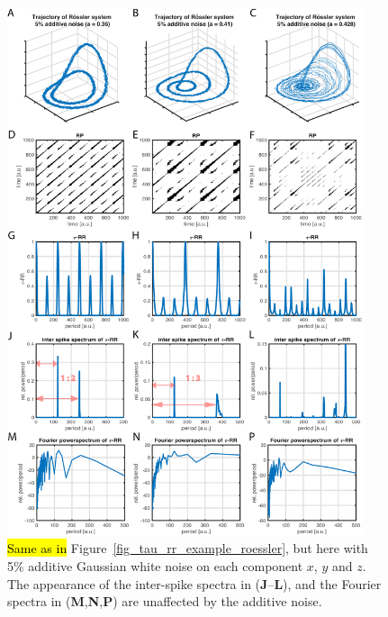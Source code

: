 \documentclass[entropy,article,accept,pdftex,moreauthors]{Definitions/mdpi}
\begin{document}
\begin{figure}[H]\ContinuedFloat

 \includegraphics[width=0.93\textwidth]{./figures/A3B}
 \caption{\hl{Same as in} %
 Figure~\ref{fig_tau_rr_example_roessler}, but here with 5\% additive Gaussian white noise on each component $x$, $y$ and $z$. The appearance of the inter-spike spectra 
 in (\textbf{J}--\textbf{L}), and the Fourier spectra in (\textbf{M},\textbf{N},\textbf{P}) are unaffected by the additive noise.}
\label{fig_tau_rr_example_roessler_noise}
\end{figure}

\vspace{-6pt}
\end{document}
